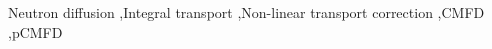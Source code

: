 Neutron diffusion \sep Integral transport \sep Non-linear transport correction \sep CMFD \sep pCMFD
